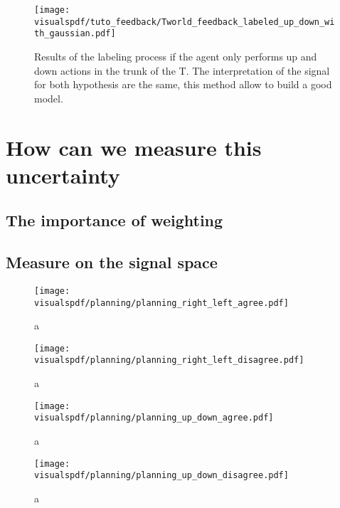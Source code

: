 \begin{figure}[!ht]
  \centering
  \texttt{[image: \\visualspdf/tuto\_feedback/Tworld\_feedback\_labeled\_up\_down\_with\_gaussian.pdf]}
  \caption{Results of the labeling process if the agent only performs up and down actions in the trunk of the T. The interpretation of the signal for both hypothesis are the same, this method allow to build a good model.}
  \label{fig:planningupdown}
\end{figure}


\section{How can we measure this uncertainty}

\subsection{The importance of weighting}

\subsection{Measure on the signal space}

\begin{figure}[!ht]
  \centering
  \texttt{[image: \\visualspdf/planning/planning\_right\_left\_agree.pdf]}
  \caption{a}
  \label{fig:uncertaintysignalrightleftagree}
\end{figure}


\begin{figure}[!ht]
  \centering
  \texttt{[image: \\visualspdf/planning/planning\_right\_left\_disagree.pdf]}
  \caption{a}
  \label{fig:uncertaintysignalrightleftdisagree}
\end{figure}


\begin{figure}[!ht]
  \centering
  \texttt{[image: \\visualspdf/planning/planning\_up\_down\_agree.pdf]}
  \caption{a}
  \label{fig:uncertaintysignalupdownagree}
\end{figure}


\begin{figure}[!ht]
  \centering
  \texttt{[image: \\visualspdf/planning/planning\_up\_down\_disagree.pdf]}
  \caption{a}
  \label{fig:uncertaintysignalupdowndisagree}
\end{figure}


